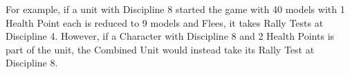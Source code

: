 For example, if a unit with Discipline 8 started the game with 40 models with 1 Health Point each is reduced to 9 models and Flees, it takes Rally Tests at Discipline 4. However, if a Character with Discipline 8 and 2 Health Points is part of the unit, the Combined Unit would instead take its Rally Test at Discipline 8.

\RBemc
